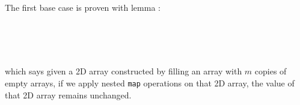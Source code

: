 \documentclass{l4proj}
\begin{document}
The first base case is proven with lemma :
\begin{code}%
\>[0]\AgdaSpace{}%
\AgdaSymbol{:}%
\>[644I]\AgdaSymbol{\{}\AgdaSpace{}%
\AgdaSpace{}%
\AgdaSymbol{:}\AgdaSpace{}%
\AgdaSymbol{\}}\AgdaSpace{}%
\AgdaSpace{}%
\AgdaSymbol{(}\AgdaSpace{}%
\AgdaSymbol{:}\AgdaSpace{}%
\AgdaSymbol{)}\AgdaSpace{}%
\AgdaSpace{}%
\AgdaSymbol{(}\AgdaSpace{}%
\AgdaSymbol{:}\AgdaSpace{}%
\AgdaSpace{}%
\AgdaSpace{}%
\AgdaSymbol{)}\AgdaSpace{}%
\<%
\\
\>[.][@{}l@{}]\<[644I]%
\>[11]\AgdaSpace{}%
\AgdaSymbol{(}\AgdaSpace{}%
\AgdaSymbol{)}\AgdaSpace{}%
\AgdaSymbol{(}\AgdaSpace{}%
\AgdaSpace{}%
\AgdaInductiveConstructor{[]}\AgdaSymbol{)}\AgdaSpace{}%
\AgdaSpace{}%
\AgdaSpace{}%
\AgdaSpace{}%
\AgdaInductiveConstructor{[]}\<%
\\
\>[0]\AgdaSpace{}%
\AgdaSpace{}%
\AgdaSpace{}%
\AgdaSymbol{=}\AgdaSpace{}%
\<%
\\
\>[0]\AgdaSpace{}%
\AgdaSymbol{(}\AgdaSpace{}%
\AgdaSymbol{)}\AgdaSpace{}%
\AgdaSpace{}%
\AgdaSymbol{=}\AgdaSpace{}%
\AgdaSpace{}%
\AgdaSymbol{(}\AgdaInductiveConstructor{[]}\AgdaSpace{}%
\AgdaSymbol{)}\AgdaSpace{}%
\AgdaSymbol{(}\AgdaSpace{}%
\AgdaSpace{}%
\AgdaSymbol{)}\<%
\end{code}
which says given a 2D array constructed by filling an array with $m$ copies of empty arrays, if we apply nested \texttt{map} operations on that 2D array, the value of that 2D array remains unchanged. 
\end{document}
